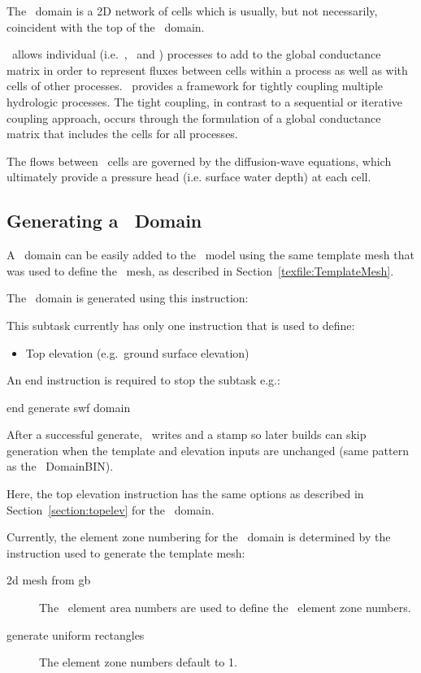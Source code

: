 \label{texfile:SWF}
The \swf\ domain is a 2D network of cells which is usually, but not necessarily, coincident with the top of the \gwf\ domain.

\mfus\ allows individual (i.e.\ \gwf, \swf\ and \cln)  processes  to add to the global
conductance matrix in order to represent fluxes between cells
within a process as well as with cells of other processes.
\mfus\ provides a framework for tightly
coupling multiple hydrologic processes. The tight coupling, in
contrast to a sequential or iterative coupling approach, occurs
through the formulation of a global conductance matrix that
includes the cells for all processes.

The flows between \swf\ cells are governed by the diffusion-wave equations, which ultimately provide a pressure head (i.e. surface water depth) at each cell.

\subsection{Generating a \swf\ Domain}
A \swf\ domain can be easily added to the \mfus\ model using the same template mesh that was used to define the \gwf\ mesh, as described in Section~\ref{texfile:TemplateMesh}.

The \swf\ domain is generated using this instruction:

    {This subtask currently has only one instruction that is used to define:
     \begin{itemize}
        \item Top elevation (e.g.\ ground surface elevation)
    \end{itemize}

    An end instruction is required to stop the subtask e.g.:

    {\Large \sf end generate swf domain}

    After a successful generate, \mut\ writes  and a  stamp so later builds can skip generation when the template and elevation inputs are unchanged (same pattern as the \gwf\ DomainBIN).
    }

Here, the \textsf{top elevation} instruction has the same options as described in Section~\ref{section:topelev} for the \gwf\ domain.

Currently, the element zone numbering for the \swf\ domain is determined by the instruction used to generate the template mesh:
\begin{description}
  \item[2d mesh from gb] The \gb\ element area numbers are used to define the \mfus\ element zone numbers.
  \item[generate uniform rectangles] The element zone numbers default to 1.
\end{description}

